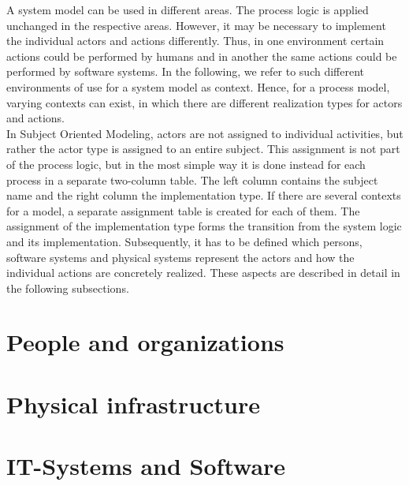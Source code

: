 A system model can be used in different areas. The process logic is applied unchanged in the respective areas. However, it may be necessary to implement the individual actors and actions differently. Thus, in one environment certain actions could be performed by humans and in another the same actions could be performed by software systems. In the following, we refer to such different environments of use for a system model as context. Hence, for a process model, varying contexts can exist, in which there are different realization types for actors and actions.\\ 
In Subject Oriented Modeling, actors are not assigned to individual activities, but rather the actor type is assigned to an entire subject. This assignment is not part of the process logic, but in the most simple way it is done instead for each process in a separate two-column table. The left column contains the subject name and the right column the implementation type. If there are several contexts for a model, a separate assignment table is created for each of them.
The assignment of the implementation type forms the transition from the system logic and its implementation. Subsequently, it has to be defined which persons, software systems and physical systems represent the actors and how the individual actions are concretely realized. These aspects are described in detail in the following subsections.

\section{People and organizations}


\section{Physical infrastructure}

\section{IT-Systems and Software}


